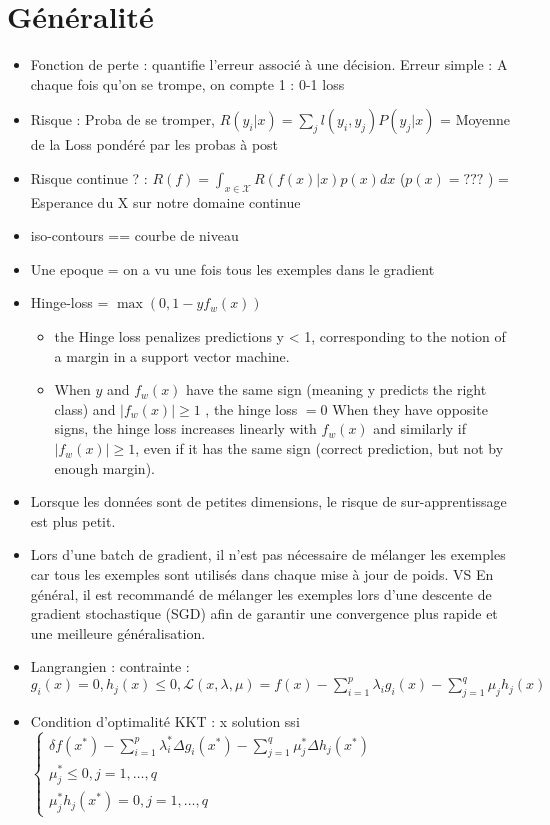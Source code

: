 \documentclass{article}
\begin{document}

\section{Généralité}
\begin{itemize}
    \item Fonction de perte : quantifie l'erreur associé à une décision. Erreur simple : A chaque fois qu'on se trompe, on compte 1 : 0-1 loss
    \item Risque : Proba de se tromper, $ R(y_i | x) = \sum_{j}^{} l(y_i, y_j)P(y_j | x)$ = Moyenne de la Loss pondéré par les probas à post
    \item Risque continue ? : $ R(f) = \int_{x \in \mathcal{X}}^{}R(f(x)|x)p(x) dx  $ ($ p(x) = ??? $ ) = Esperance du X sur notre domaine continue
    \item iso-contours == courbe de niveau
    \item Une epoque = on a vu une fois tous les exemples dans le gradient
    \item Hinge-loss = $ \max (0, 1 - y f_w(x)) $ \begin{itemize}
        \item the Hinge loss penalizes predictions y < 1, corresponding to the notion of a margin in a support vector machine.
        \item When $ y $ and $ f_w(x) $ have the same sign (meaning y predicts the right class) and $ \left| f_w(x) \right| \geq 1 $ , the hinge loss $ = 0 $  When they have opposite signs, the hinge loss increases linearly with $ f_w(x) $  and similarly if $ \left| f_w(x) \right| \geq 1 $, even if it has the same sign (correct prediction, but not by enough margin).
    \end{itemize}
    \item Lorsque les données sont de petites dimensions, le risque de sur-apprentissage est plus petit.
    \item Lors d'une batch de gradient, il n'est pas nécessaire de mélanger les exemples car tous les exemples sont utilisés dans chaque mise à jour de poids. VS En général, il est recommandé de mélanger les exemples lors d'une descente de gradient stochastique (SGD) afin de garantir une convergence plus rapide et une meilleure généralisation.
    \item Langrangien : contrainte : $ \displaystyle g_i(x) = 0, h_j(x) \leq 0, \mathcal{L}(x, \lambda , \mu ) = f(x) - \sum_{i=1}^{p} \lambda _i g_i(x) - \sum_{j=1}^{q} \mu _j h_j(x)$
    \item Condition d'optimalité KKT : x solution ssi $ \displaystyle \begin{cases}
        \delta f(x^*) - \sum_{i=1}^{p} \lambda _i^* \Delta g_i(x^*) - \sum_{j=1}^{q} \mu _j^* \Delta  h_j(x^*)\\
        \mu _j ^* \leq 0, j = 1, \dots, q \\
        \mu _j^* h_j(x^*) = 0, j = 1, \dots, q
    \end{cases}  $ 
\end{itemize}
\end{document}
